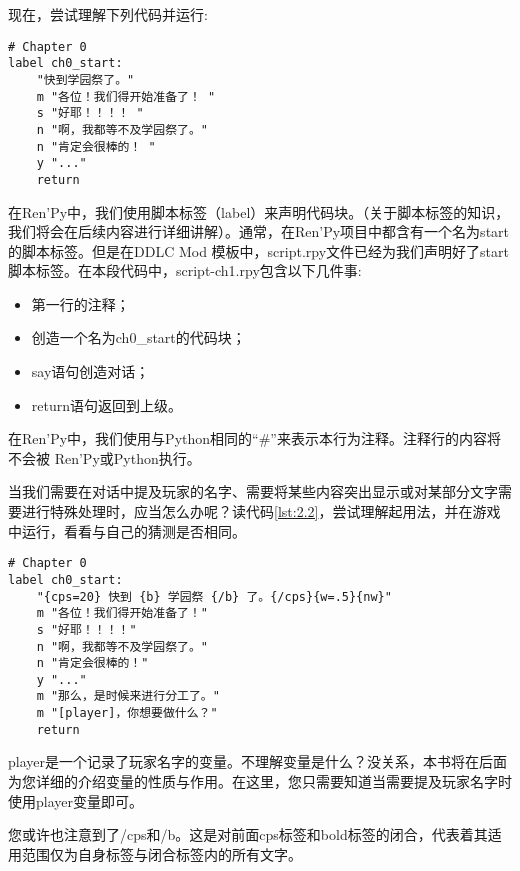 现在，尝试理解下列代码并运行:

\begin{lstlisting}[caption=scipt-ch1.rpy, label={lst:2.1}]
# Chapter 0
label ch0_start:
    "快到学园祭了。"
    m "各位！我们得开始准备了！ "
    s "好耶！！！！ "
    n "啊，我都等不及学园祭了。"
    n "肯定会很棒的！ "
    y "..."
    return
\end{lstlisting}

在Ren'Py中，我们使用脚本标签（label）来声明代码块。（关于脚本标签的知识，我们将会在后续内容进行详细讲解）。通常，在Ren'Py项目中都含有一个名为start的脚本标签。但是在DDLC Mod 模板中，script.rpy文件已经为我们声明好了start脚本标签。在本段代码中，script-ch1.rpy包含以下几件事:

\begin{itemize}
    \item 第一行的注释；
    \item 创造一个名为ch0\_start的代码块；
    \item say语句创造对话；
    \item return语句返回到上级。
\end{itemize}

\begin{Comment}
在Ren'Py中，我们使用与Python相同的“\#”来表示本行为注释。注释行的内容将不会被 Ren'Py或Python执行。
\end{Comment}

当我们需要在对话中提及玩家的名字、需要将某些内容突出显示或对某部分文字需要进行特殊处理时，应当怎么办呢？读代码\ref{lst:2.2}，尝试理解起用法，并在游戏中运行，看看与自己的猜测是否相同。

\begin{lstlisting}[caption=scipt-ch1.rpy, label={lst:2.2}]
# Chapter 0
label ch0_start:
    "{cps=20} 快到 {b} 学园祭 {/b} 了。{/cps}{w=.5}{nw}"
    m "各位！我们得开始准备了！"
    s "好耶！！！！"
    n "啊，我都等不及学园祭了。"
    n "肯定会很棒的！"
    y "..."
    m "那么，是时候来进行分工了。"
    m "[player]，你想要做什么？"
    return
\end{lstlisting}

\begin{ExtraKnowledge}
player是一个记录了玩家名字的变量。不理解变量是什么？没关系，本书将在后面为您详细的介绍变量的性质与作用。在这里，您只需要知道当需要提及玩家名字时使用player变量即可。

您或许也注意到了{/cps}和{/b}。这是对前面cps标签和bold标签的闭合，代表着其适用范围仅为自身标签与闭合标签内的所有文字。
\end{ExtraKnowledge}

